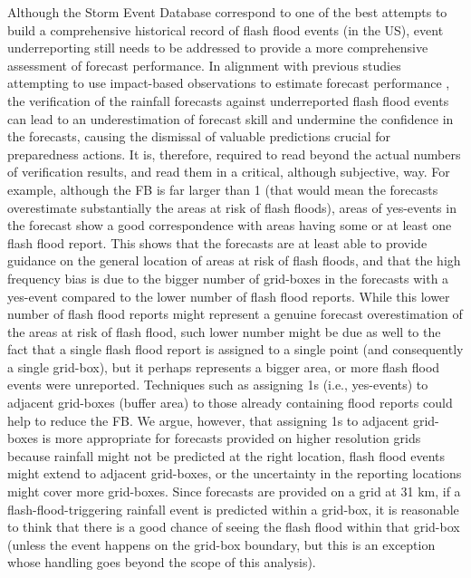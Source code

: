 Although  the Storm Event Database correspond to one of the best attempts to build a comprehensive historical record of flash flood events (in the US), event underreporting still needs to be addressed to provide a more comprehensive assessment of forecast performance. In alignment with previous studies attempting to use impact-based observations to estimate forecast performance \citep{Hitchens_2013, Robbins_2018, Mitheu_2023, Mitheu_2025}, the verification of the rainfall forecasts against underreported flash flood events can lead to an underestimation of forecast skill and undermine the confidence in the forecasts, causing the dismissal of valuable predictions crucial for preparedness actions. It is, therefore, required to read beyond the actual numbers of verification results, and read them in a critical, although subjective, way. For example, although the FB is far larger than 1 (that would mean the forecasts overestimate substantially the areas at risk of flash floods), areas of yes-events in the forecast show a good correspondence with areas having some or at least one flash flood report. This shows that the forecasts are at least able to provide guidance on the general location of areas at risk of flash floods, and that the high frequency bias is due to the bigger number of grid-boxes in the forecasts with a yes-event compared to the lower number of flash flood reports. While this lower number of flash flood reports might represent a genuine forecast overestimation of the areas at risk of flash flood, such lower number might be due as well to the fact that a single flash flood report is assigned to a single point (and consequently a single grid-box), but it perhaps represents a bigger area, or more flash flood events were unreported. Techniques such as assigning 1s (i.e., yes-events) to adjacent grid-boxes (buffer area) to those already containing flood reports could help to reduce the FB. We argue, however, that assigning 1s to adjacent grid-boxes is more appropriate for forecasts provided on higher resolution grids because rainfall might not be predicted at the right location, flash flood events might extend to adjacent grid-boxes, or the uncertainty in the reporting locations might cover more grid-boxes. Since forecasts are provided on a grid at 31 km, if a flash-flood-triggering rainfall event is predicted within a grid-box, it is reasonable to think that there is a good chance of seeing the flash flood within that grid-box (unless the event happens on the grid-box boundary, but this is an exception whose handling goes beyond the scope of this analysis). 

